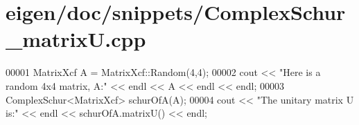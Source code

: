 \hypertarget{eigen_2doc_2snippets_2_complex_schur__matrix_u_8cpp_source}{}\section{eigen/doc/snippets/\+Complex\+Schur\+\_\+matrixU.cpp}
\label{eigen_2doc_2snippets_2_complex_schur__matrix_u_8cpp_source}

\begin{DoxyCode}
00001 MatrixXcf A = MatrixXcf::Random(4,4);
00002 cout << \textcolor{stringliteral}{"Here is a random 4x4 matrix, A:"} << endl << A << endl << endl;
00003 ComplexSchur<MatrixXcf> schurOfA(A);
00004 cout << \textcolor{stringliteral}{"The unitary matrix U is:"} << endl << schurOfA.matrixU() << endl;
\end{DoxyCode}
